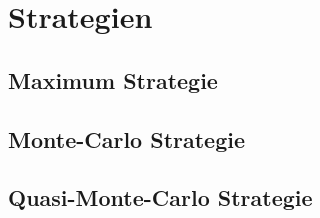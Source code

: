 \documentclass[a4paper,12pt]{llncs}
\numberwithin{equation}{section}
\begin{document}
\section{Strategien}
\subsection{Maximum Strategie}
\subsection{Monte-Carlo Strategie}
\subsection{Quasi-Monte-Carlo Strategie}


\newpage

 

\end{document}
